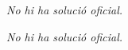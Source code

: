 \begin{solapartat}
\textit{No hi ha solució oficial.}
\end{solapartat}

\begin{solapartat}
\textit{No hi ha solució oficial.}
\end{solapartat}
